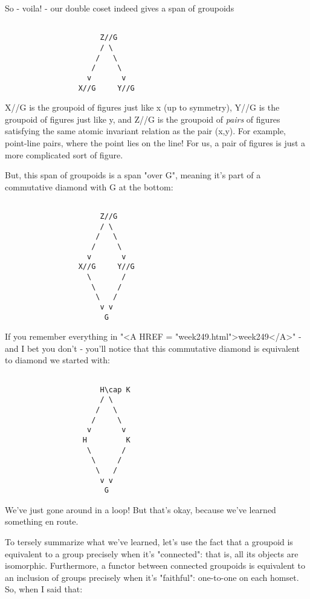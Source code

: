 So - voila! - our double coset indeed gives a span of groupoids


\begin{verbatim}

                      Z//G
                      / \
                     /   \
                    /     \
                   v       v
                 X//G     Y//G
\end{verbatim}
    

X//G is the groupoid of figures just like x (up to symmetry), Y//G
is the groupoid of figures just like y, and Z//G is the groupoid of 
\emph{pairs} of figures satisfying the same atomic invariant relation
as the pair (x,y).  For example, point-line pairs, where the point
lies on the line!  For us, a pair of figures is just a more complicated
sort of figure.

But, this span of groupoids is a span "over G", meaning it's
part of a commutative diamond with G at the bottom:


\begin{verbatim}

                      Z//G
                      / \
                     /   \
                    /     \
                   v       v
                 X//G     Y//G
                   \       /
                    \     /
                     \   /
                      v v
                       G
\end{verbatim}
    

If you remember everything in "<A HREF =
"week249.html">week249</A>" - and I bet you don't - you'll notice
that this commutative diamond is equivalent to diamond we started
with:


\begin{verbatim}

                      H\cap K
                      / \
                     /   \
                    /     \
                   v       v
                  H         K
                   \       /
                    \     /
                     \   /
                      v v
                       G
\end{verbatim}
    
We've just gone around in a loop!  But that's okay, because we've
learned something en route.

To tersely summarize what we've learned, let's use the fact that a 
groupoid is equivalent to a group precisely when it's "connected":
that is, all its objects are isomorphic.  Furthermore, a functor between 
connected groupoids is equivalent to an inclusion of groups precisely 
when it's "faithful": one-to-one on each homset.  So, when I said that:

